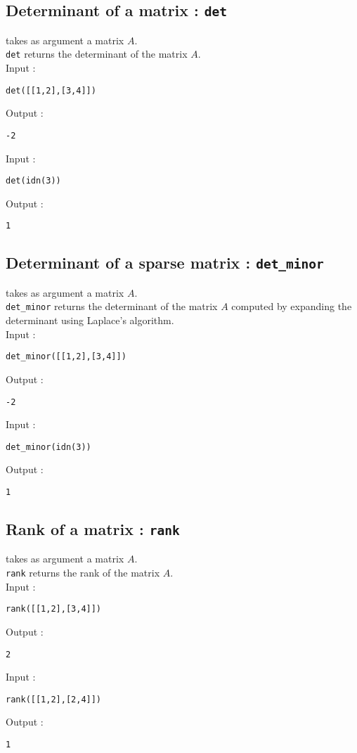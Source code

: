 \documentclass[a4paper,11pt]{book}
\begin{document}
\subsection{Determinant of a matrix : {\tt det}}
 takes as argument a matrix $A$.\\
{\tt det} returns the determinant of the matrix $A$.\\
Input :
\begin{center}{\tt det([[1,2],[3,4]])}\end{center}
Output :
\begin{center}{\tt -2}\end{center}
Input :
\begin{center}{\tt det(idn(3))}\end{center}
Output :
\begin{center}{\tt 1}\end{center}

\subsection{Determinant of a sparse matrix : {\tt det\_minor}}
 takes as argument a matrix $A$.\\
{\tt det\_minor} returns the determinant of the matrix $A$ computed by 
expanding the determinant using Laplace's algorithm.\\
Input :
\begin{center}{\tt det\_minor([[1,2],[3,4]])}\end{center}
Output :
\begin{center}{\tt -2}\end{center}
Input :
\begin{center}{\tt det\_minor(idn(3))}\end{center}
Output :
\begin{center}{\tt 1}\end{center}

\subsection{Rank of a matrix : {\tt rank}}
 takes as argument a matrix $A$.\\
{\tt rank} returns the rank of the matrix $A$.\\
Input :
\begin{center}{\tt rank([[1,2],[3,4]])}\end{center}
Output :
\begin{center}{\tt 2}\end{center}
Input :
\begin{center}{\tt rank([[1,2],[2,4]])}\end{center}
Output :
\begin{center}{\tt 1}\end{center}
\end{document}
